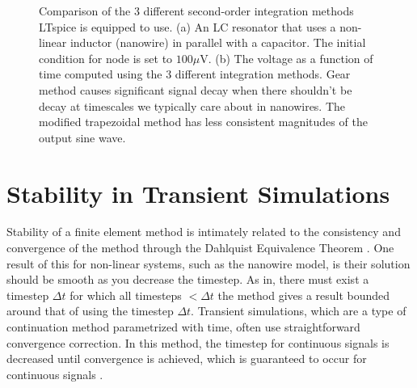 \begin{figure}
    \centering
    \caption{Comparison of the 3 different second-order integration methods
    LTspice is equipped to use. (a) An LC resonator that uses a non-linear inductor
    (nanowire) in parallel with a capacitor. The initial condition for node  is set
    to $100\mu$V.
    (b) The voltage as a function of time
    computed using the 3 different integration methods. Gear method causes significant
    signal decay when there shouldn't be decay at timescales we typically care about 
    in nanowires. The modified trapezoidal method
    has less consistent magnitudes of the output sine wave.}
    \label{fig:trapz_vs_gear}
\end{figure}

\section{Stability in Transient Simulations}

Stability of a finite element method is intimately related to the consistency and convergence of
the method through the Dahlquist Equivalence Theorem \cite{DAHLQUIST}. 
One result of this for non-linear systems,
such as the nanowire model, is their solution should be smooth as you decrease the timestep.
As in, there must exist a timestep $\Delta t$ for which all timesteps $< \Delta t$ the method
gives a result bounded around that of using the timestep $\Delta t$. Transient simulations, which are a 
type of continuation method parametrized with time, often use straightforward convergence correction. 
In this method, the timestep for continuous signals is decreased until convergence is achieved, 
which is guaranteed to occur for continuous signals \cite{spice-book}.

